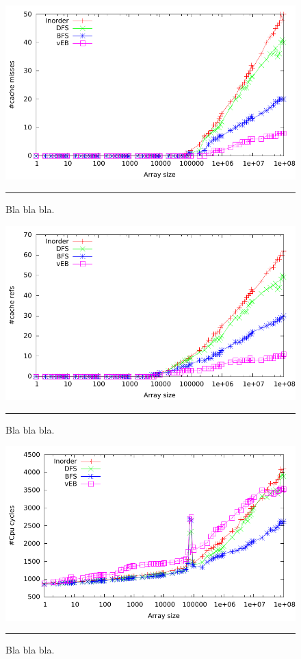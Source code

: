 \begin{figure}[htbp]
	\centering
		\includegraphics[width=\textwidth]{./Figures/Project1/Cache_misses.pdf}
		\rule{35em}{0.5pt}
	\caption[Cache misses]{
	Bla bla bla.
	}
	\label{fig:Cache_misses_p1}
\end{figure}



\begin{figure}[htbp]
	\centering
		\includegraphics[width=\textwidth]{./Figures/Project1/Cache_refs.pdf}
		\rule{35em}{0.5pt}
	\caption[Cache refs]{
	Bla bla bla.
	}
	\label{fig:Cache_refs_p1}
\end{figure}



\begin{figure}[htbp]
	\centering
		\includegraphics[width=\textwidth]{./Figures/Project1/Cpu_cycles.pdf}
		\rule{35em}{0.5pt}
	\caption[CPU cycles]{
	Bla bla bla.
	}
	\label{fig:Cpu_cycles_p1}
\end{figure}


